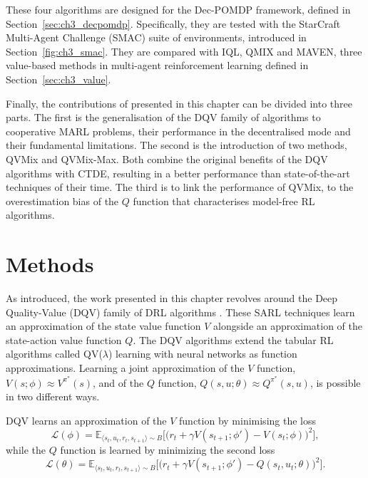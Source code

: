 These four algorithms are designed for the Dec-POMDP framework, defined in Section~\ref{sec:ch3_decpomdp}.
Specifically, they are tested with the StarCraft Multi-Agent Challenge (SMAC) suite of environments, introduced in Section~\ref{fig:ch3_smac}.
They are compared with IQL, QMIX and MAVEN, three value-based methods in multi-agent reinforcement learning defined in Section~\ref{sec:ch3_value}.

Finally, the contributions of \citep{leroy2020qvmix} presented in this chapter can be divided into three parts.
The first is the generalisation of the DQV family of algorithms to cooperative MARL problems, their performance in the decentralised mode and their fundamental limitations.
The second is the introduction of two methods, QVMix and QVMix-Max.
Both combine the original benefits of the DQV algorithms with CTDE, resulting in a better performance than state-of-the-art techniques of their time.
The third is to link the performance of QVMix, to the overestimation bias of the $Q$ function that characterises model-free RL algorithms.

\section{Methods} \label{sec:ch4_methods} 

As introduced, the work presented in this chapter revolves around the Deep Quality-Value (DQV) family of DRL algorithms \citep{sabatelli2018deepQV, sabatelli2020deep}.
These SARL techniques learn an approximation of the state value function $V$ alongside an approximation of the state-action value function $Q$.
The DQV algorithms extend the tabular RL algorithms called QV($\lambda$) learning \citep{wiering2005qv, wiering2009qv} with neural networks as function approximations.
Learning a joint approximation of the $V$ function, $V(s;\phi)\approx V^{\pi^*}(s)$, and of the $Q$ function, $Q(s, u;\theta)\approx Q^{\pi^*}(s, u)$, is possible in two different ways.

DQV learns an approximation of the $V$ function by minimising the loss
\begin{equation}
    \mathcal{L}(\phi) = \mathbb{E}_{\langle s_{t}, u_{t},r_{t},s_{t+1}\rangle\sim B} \bigg[\big(r_{t} + \gamma V(s_{t+1}; \phi') - V(s_{t}; \phi)\big)^{2}\bigg],
    \label{eq:ch4_dqv_v_update}
\end{equation} 
while the $Q$ function is learned by minimizing the second loss
\begin{equation}
    \mathcal{L}(\theta) = \mathbb{E}_{\langle s_{t}, u_{t},r_{t},s_{t+1}\rangle\sim B} \bigg[\big(r_{t} + \gamma V(s_{t+1}; \phi')  - Q(s_{t}, u_{t}; \theta)\big)^{2}\bigg].
\label{eq:ch4_dqv_q_update}
\end{equation}
    
